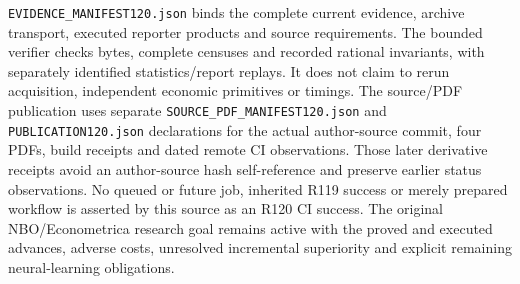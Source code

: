 \nolinkurl{EVIDENCE_MANIFEST120.json} binds the complete current evidence,
archive transport, executed reporter products and source requirements.
The bounded verifier checks bytes, complete censuses and recorded rational
invariants, with separately identified statistics/report replays. It does
not claim to rerun acquisition, independent economic primitives or timings.
The source/PDF publication uses separate
\nolinkurl{SOURCE_PDF_MANIFEST120.json} and
\nolinkurl{PUBLICATION120.json} declarations for the actual author-source
commit, four PDFs, build receipts and dated remote CI observations. Those
later derivative receipts avoid an author-source hash self-reference and
preserve earlier status observations. No queued or future job, inherited
R119 success or merely prepared workflow is asserted by this source as an
R120 CI success. The original NBO/Econometrica research goal remains active
with the proved and executed advances, adverse costs, unresolved
incremental superiority and explicit remaining neural-learning obligations.
